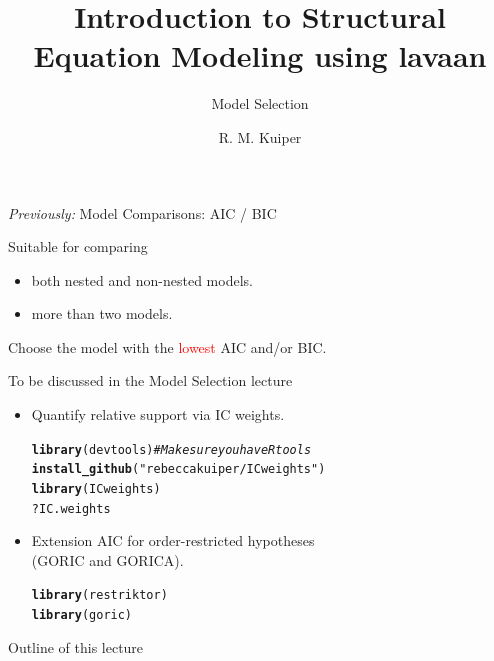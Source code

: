 \documentclass[10pt]{beamer}\usepackage[]{graphicx}\usepackage[]{xcolor}
\title{Introduction to Structural Equation Modeling using lavaan}
\subtitle{Model Selection}
\author{R. M. Kuiper}
\institute{Department of Methodology \& Statistics \\ Utrecht University}
\date{}
\makeatletter
\newcommand{\hlstr}[1]{\textcolor[rgb]{0.192,0.494,0.8}{#1}}%
\newcommand{\hlcom}[1]{\textcolor[rgb]{0.678,0.584,0.686}{\textit{#1}}}%
\newcommand{\hlopt}[1]{\textcolor[rgb]{0,0,0}{#1}}%
\newcommand{\hlstd}[1]{\textcolor[rgb]{0.345,0.345,0.345}{#1}}%
\newcommand{\hlkwd}[1]{\textcolor[rgb]{0.737,0.353,0.396}{\textbf{#1}}}%
\newenvironment{kframe}{%
 \def\at@end@of@kframe{}%
 \ifinner\ifhmode%
  \def\at@end@of@kframe{\end{minipage}}%
  \begin{minipage}{\columnwidth}%
 \fi\fi%
 \def\FrameCommand##1{\hskip\@totalleftmargin \hskip-\fboxsep
 \colorbox{shadecolor}{##1}\hskip-\fboxsep
     \hskip-\linewidth \hskip-\@totalleftmargin \hskip\columnwidth}%
 \MakeFramed {\advance\hsize-\width
   \@totalleftmargin\z@ \linewidth\hsize
   \@setminipage}}%
 {\par\unskip\endMakeFramed%
 \at@end@of@kframe}
\newenvironment{knitrout}{}{} %
\makeatother
\begin{document}

\begin{frame}[t, plain]
  \titlepage
\end{frame}
%
%
\begin{frame}[fragile]{\textit{Previously:} Model Comparisons: AIC / BIC}

Suitable for comparing
\begin{itemize}
  \item both nested and non-nested models.
  \item more than two models.
\end{itemize}

\vspace*{5mm}

Choose the model with the \textcolor{red}{lowest} AIC and/or BIC.

\vspace*{5mm}

To be discussed in the Model Selection lecture
\begin{itemize}
  \item Quantify relative support via IC weights.\\
\begin{knitrout}
\color{fgcolor}\begin{kframe}
\begin{alltt}
\hlkwd{library}\hlstd{(devtools)} \hlcom{# Make sure you have Rtools}
\hlkwd{install_github}\hlstd{(}\hlstr{"rebeccakuiper/ICweights"}\hlstd{)}
\hlkwd{library}\hlstd{(ICweights)}
\hlopt{?}\hlstd{IC.weights}
\end{alltt}
\end{kframe}
\end{knitrout}
  \item Extension AIC for order-restricted hypotheses \\ (GORIC and GORICA).\\
\begin{knitrout}
\color{fgcolor}\begin{kframe}
\begin{alltt}
\hlkwd{library}\hlstd{(restriktor)}
\hlkwd{library}\hlstd{(goric)}
\end{alltt}
\end{kframe}
\end{knitrout}
\end{itemize}

\end{frame}
%
\begin{frame}{Outline of this lecture}
\tableofcontents[hidesubsections]
\end{frame}
%
\end{document}
